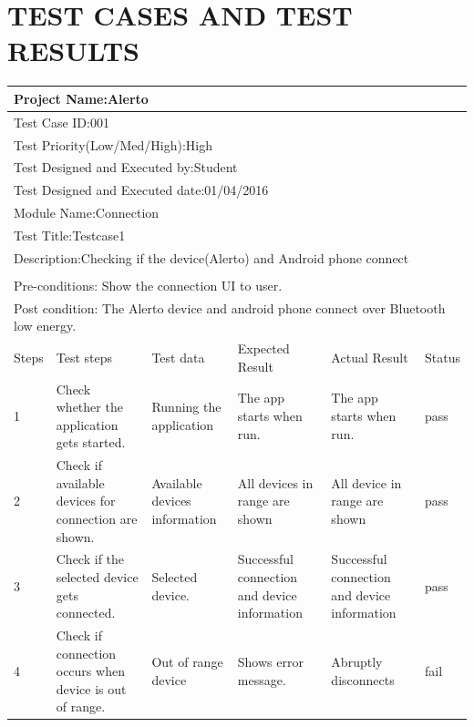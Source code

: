 \documentclass[12pt,a4paper]{report}
\begin{document}
\section{TEST CASES AND TEST RESULTS}

\begin{table}[!h]

		\begin{tabular}{|p{0.8cm}|p{2.5cm}|p{3cm}|p{3cm}|p{3cm}|p{2.2cm}|}
			\hline
			\multicolumn{6}{|l|}{Project Name:Alerto}\\
			\hline
			\multicolumn{6}{|l|}{Test Case ID:001}\\
			\hline
			\multicolumn{6}{|l|}{Test Priority(Low/Med/High):High} \\ 
			\hline
			\multicolumn{6}{|l|}{Test Designed and Executed by:Student}\\
			\hline
			\multicolumn{6}{|l|}{Test Designed and Executed date:01/04/2016}\\
			\hline
			\multicolumn{6}{|l|}{Module Name:Connection} \\ 
			\hline
			\multicolumn{6}{|l|}{Test Title:Testcase1} \\
			\hline
			\multicolumn{6}{|l|}{Description:Checking if the device(Alerto) and Android phone connect} \\
			\hline
			 \\
			\hline
			\multicolumn{6}{|l|}{Pre-conditions: Show the connection UI to user.}\\
			\hline
			\multicolumn{6}{|l|}{Post condition: The Alerto device and android phone connect over Bluetooth  low energy.}\\
			\hline
			Steps & Test steps & Test data & Expected Result & Actual Result & Status \\ 
			\hline
			1	& Check whether the application gets started.& 	Running the application	& The app starts when run.&	The app starts when run. &	pass\\ 
			\hline
			2&	Check if available devices for connection are shown.&	Available devices information	& All devices in range are shown&	All device in range are shown	& pass\\
			\hline
			3&	Check if the selected device gets connected.&	Selected device.&	Successful connection and device information &	Successful connection and device information	& pass \\
			\hline
			4 &	Check if connection occurs when device is out of range.&	Out of range device &	Shows error message. &	Abruptly disconnects &	fail \\
			\hline
		\end{tabular}
\end{table}
\end{document}
